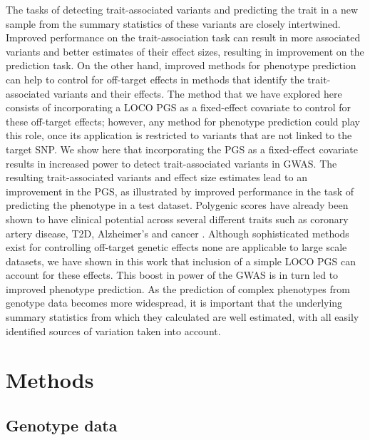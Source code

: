\documentclass[doublespacing]{bmcart}
\begin{document}
The tasks of detecting trait-associated variants and predicting the trait in a new sample from the summary statistics of these variants are closely intertwined. Improved performance on the trait-association task can result in more associated variants and better estimates of their effect sizes, resulting in improvement on the prediction task. On the other hand, improved methods for phenotype prediction can help to control for off-target effects in methods that identify the trait-associated variants and their effects. The method that we have explored here consists of incorporating a LOCO PGS as a fixed-effect covariate to control for these off-target effects; however, any method for phenotype prediction could play this role, once its application is restricted to variants that are not linked to the target SNP. We show here that incorporating the PGS as a fixed-effect covariate results in increased power to detect trait-associated variants in GWAS. The resulting trait-associated variants and effect size estimates lead to an improvement in the PGS, as illustrated by improved performance in the task of predicting the phenotype in a test dataset. Polygenic scores have already been shown to have clinical potential across several different traits such as coronary artery disease, T2D, Alzheimer's and cancer \cite{lambert2019towards}. Although sophisticated methods exist for controlling off-target genetic effects none are applicable to large scale datasets, we have shown in this work that inclusion of a simple LOCO PGS can account for these effects. This boost in power of the GWAS is in turn led to improved phenotype prediction. As the prediction of complex phenotypes from genotype data becomes more widespread, it is important that the underlying summary statistics from which they calculated are well estimated, with all easily identified sources of variation taken into account.
 
\section*{Methods}
\subsection*{Genotype data} 
\end{document}
